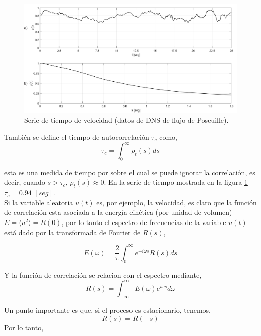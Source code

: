 \documentclass[executivepaper,12pt]{article}
\numberwithin{equation}{section}
\begin{document}
\begin{figure}[H]
	\begin{center}
		\includegraphics[scale=1]{probabilidad5}
	\end{center}
	\caption{Serie de tiempo de velocidad (datos de DNS de flujo de Poseuille). }
	\label{fig-prob5}
\end{figure}

También se define el tiempo de autocorrelación $\tau_c$ como,
\begin{equation}
	\tau_c=\int_{0}^{\infty} \rho_t(s) ds  
\end{equation}

esta es una medida de tiempo por sobre el cual se puede ignorar la correlación, es decir, cuando $s>\tau_c$, $\rho_t(s)\approx 0$. En la serie de tiempo mostrada en la figura \ref{fig-prob5} $\tau_c=0.94$ $[seg]$.\\


Si la variable aleatoria $u(t)$ es, por ejemplo, la velocidad, es claro que la función de correlación esta asociada a la energía cinética (por unidad de volumen) $E=\langle u^2 \rangle =R(0)$, por lo tanto el espectro de frecuencias de la variable $u(t)$ está dado por la transformada de Fourier de $R(s)$, 

\begin{equation*}
	E(\omega)=\frac{2}{\pi}\int_{0}^{\infty}e^{-i\omega s} R(s) ds  
\end{equation*}

Y la función de correlación se relacion con el espectro mediante,
\begin{equation*}
	R(s)=\int_{-\infty}^\infty E(\omega)e^{i\omega s} d\omega
\end{equation*}


Un punto importante es que, si el proceso es estacionario, tenemos, 
\begin{equation*}
	R(s)=R(-s)
\end{equation*}
Por lo tanto,
\end{document}
